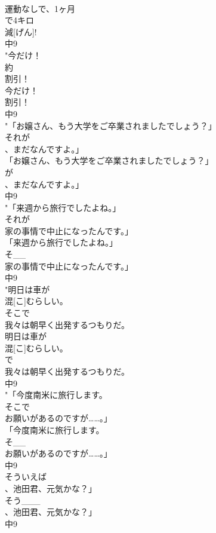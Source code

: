 \documentclass[8pt]{extreport}
\begin{document}
\begin{CJK}{UTF8}{min}
\\	運動なしで、1ヶ月
\\	で4キロ
\\	減[げん]!
\\	中9
\\	"今だけ！
\\	約
\\	割引！
\\	今だけ！
\\	割引！
\\	中9
\\	"「お嬢さん、もう大学をご卒業されましたでしょう？」
\\	それが
\\	、まだなんですよ。」
\\	「お嬢さん、もう大学をご卒業されましたでしょう？」
\\	が
\\	、まだなんですよ。」
\\	中9
\\	"「来週から旅行でしたよね。」
\\	それが
\\	家の事情で中止になったんです。」
\\	「来週から旅行でしたよね。」
\\	そ__
\\	家の事情で中止になったんです。」
\\	中9
\\	"明日は車が
\\	混[こ]むらしい。
\\	そこで
\\	我々は朝早く出発するつもりだ。
\\	明日は車が
\\	混[こ]むらしい。
\\	で
\\	我々は朝早く出発するつもりだ。
\\	中9
\\	"「今度南米に旅行します。
\\	そこで
\\	お願いがあるのですが……。」
\\	「今度南米に旅行します。
\\	そ__
\\	お願いがあるのですが……。」
\\	中9
\\	そういえば
\\	、池田君、元気かな？」
\\	そう___
\\	、池田君、元気かな？」
\\	中9

\end{CJK}
\end{document}
